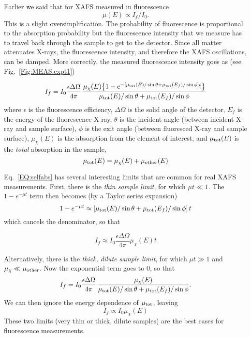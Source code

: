 Earlier we said that for XAFS measured in fluorescence
\begin{equation}
  \mu (E) \propto I_{f}/I_{0}.
\end{equation}
\noindent
This is a slight oversimplification. The probability of fluorescence is
proportional to the absorption probability but the fluorescence intensity
that we measure has to travel back through the sample to get to the
detector. Since all matter attenuates X-rays, the fluorescence intensity,
and therefore the XAFS oscillations, can be damped.  More correctly, the
measured fluorescence intensity goes as (see Fig.~\ref{Fig:MEAS:expt1})

\begin{equation}
  I_f = I_0 {\frac{\epsilon\Delta\Omega}{4\pi}} \,
  {\frac{\mu_{\chi}(E) \big\{ 1- e^{-[\mu_{\rm tot}(E)/\sin\theta +
        \mu_{\rm tot}(E_f)/\sin\phi]t}\big\}}{\mu_{\rm tot}(E)/\sin\theta
      +\mu_{\rm tot}(E_f)/\sin\phi}}
  \label{EQ:selfabs}
\end{equation}
\noindent
where $\epsilon$ is the fluorescence efficiency, $\Delta\Omega$ is the
solid angle of the detector, ${E_f}$ is the energy of the fluorescence
X-ray, $\theta$ is the incident angle (between incident X-ray and sample
surface), $\phi$ is the exit angle (between fluoresced X-ray and sample
surface), ${\mu_{\chi}(E)}$ is the absorption from the
element of interest,  and ${\mu_{\rm tot}(E)}$ is the {\emph{total}}
absorption in the sample,
\begin{equation}
 \mu_{\rm tot}(E) = \mu_{\chi}(E) + \mu_{\rm other}(E)
\end{equation}

Eq.~\ref{EQ:selfabs} has several interesting limits that are common for
real XAFS measurements.  First, there is the {\emph{thin sample limit}},
for which $\mu t \ll 1$.  The $ 1 - e^{-\mu t} $ term then becomes
(by a Taylor series expansion)
\begin{equation*}
 1 - e^{-\mu t} \approx [{\mu_{\rm tot}(E)/\sin\theta +\mu_{\rm
     tot}(E_f)/\sin\phi}]\, t
\end{equation*}
\noindent which cancels the denominator, so that

\begin{equation}
  I_f \approx I_0 {\frac{\epsilon\Delta\Omega}{4\pi}}
{\mu_{\chi}(E)} t
\end{equation}

Alternatively, there is the {\emph{thick, dilute sample limit}}, for which
$\mu t \gg 1$ and $\mu_\chi \ll \mu_{\rm other}$.  Now the exponential term
goes to 0, so that
\begin{equation}
  I_f = I_0 {\frac{\epsilon\Delta\Omega}{4\pi}} \,
  {\frac{\mu_{\chi}(E)}{\mu_{\rm tot}(E)/\sin\theta
      +\mu_{\rm tot}(E_f)/\sin\phi}}    .
\end{equation}
\noindent
We can then ignore the energy  dependence of $\mu_{\rm tot}$, leaving
\begin{equation}
  I_f \propto I_0 \mu_{\chi}(E)
\end{equation}
\noindent
These two limits (very thin or thick, dilute samples) are the best cases
for fluorescence measurements.

